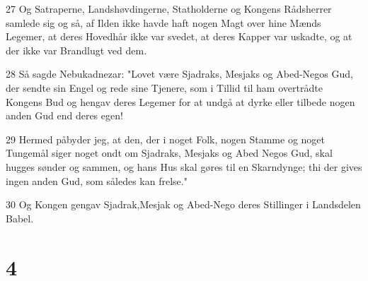 \par 27 Og Satraperne, Landshøvdingerne, Statholderne og Kongens Rådsherrer samlede sig og så, af Ilden ikke havde haft nogen Magt over hine Mænds Legemer, at deres Hovedhår ikke var svedet, at deres Kapper var uskadte, og at der ikke var Brandlugt ved dem.
\par 28 Så sagde Nebukadnezar: "Lovet være Sjadraks, Mesjaks og Abed-Negos Gud, der sendte sin Engel og rede sine Tjenere, som i Tillid til ham overtrådte Kongens Bud og hengav deres Legemer for at undgå at dyrke eller tilbede nogen anden Gud end deres egen!
\par 29 Hermed påbyder jeg, at den, der i noget Folk, nogen Stamme og noget Tungemål siger noget ondt om Sjadraks, Mesjaks og Abed Negos Gud, skal hugges sønder og sammen, og hans Hus skal gøres til en Skarndynge; thi der gives ingen anden Gud, som således kan frelse."
\par 30 Og Kongen gengav Sjadrak,Mesjak og Abed-Nego deres Stillinger i Landsdelen Babel.

\chapter{4}

